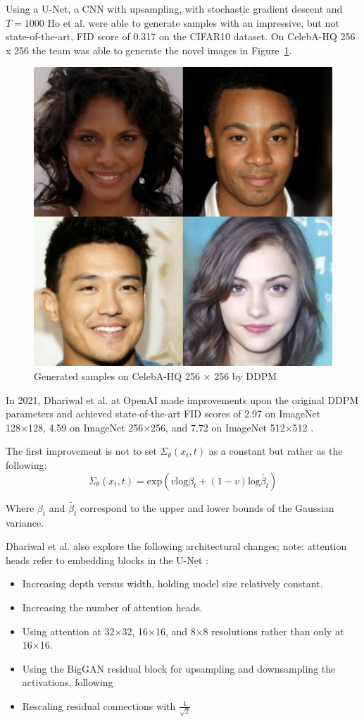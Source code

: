 \documentclass[%
 reprint,
 amsmath,amssymb,
 aps,
]{revtex4-2}
\begin{document}
Using a U-Net, a CNN with upsampling, with stochastic gradient descent and $T=1000$ Ho et al. were able to generate samples with an impressive, but not state-of-the-art, FID score of 0.317 on the CIFAR10 dataset. On CelebA-HQ 256 x 256 the team was able to generate the novel images in Figure~\ref{fig:DDPMCeleb}.

\begin{figure}[h]
    \includegraphics[width=0.6\columnwidth]{celeb.png}
    \caption{\label{fig:DDPMCeleb} Generated samples on CelebA-HQ 256 × 256 by DDPM \cite{ho2020denoising}}
\end{figure}



In 2021, Dhariwal et al. at OpenAI made improvements upon the original DDPM parameters and achieved state-of-the-art FID scores of 2.97 on ImageNet 128×128, 4.59 on ImageNet 256×256, and 7.72 on ImageNet 512×512 \cite{dhariwal2021diffusion}.

The first improvement is not to set $\Sigma_\theta(x_t, t) $ as a constant but rather as the following:
\begin{equation}
\Sigma_\theta(x_t, t) = \mathrm{exp}(v \mathrm{log} \beta_t + (1 - v) \mathrm{log} \tilde{\beta_t})
\end{equation}


Where $\beta_t$ and  $\tilde{\beta_t}$ correspond to the upper and lower bounds of the Gaussian variance.


Dhariwal et al. also explore the following architectural changes; note: attention heads refer to embedding blocks in the U-Net  \cite{dhariwal2021diffusion}:
\begin{itemize}
\item Increasing depth versus width, holding model size relatively constant.
\item Increasing the number of attention heads.
\item Using attention at 32×32, 16×16, and 8×8 resolutions rather than only at 16×16.
\item Using the BigGAN residual block for upsampling and downsampling the activations, following
\item Rescaling residual connections with $\frac{1}{\sqrt{2}}$
\end{itemize}
\end{document}
